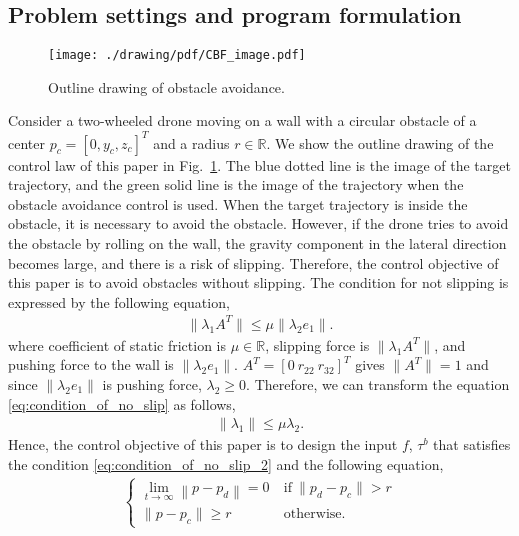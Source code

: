 \subsection{Problem settings and program formulation}
\label{subsec:problem_setting}
\begin{figure}[t]
    \centering
    \texttt{[image: ./drawing/pdf/CBF\_image.pdf]}
    \caption{Outline drawing of obstacle avoidance.}
    \label{fig:outline_drawing_of_obstacle_avoidance}
\end{figure}
Consider a two-wheeled drone moving on a wall with a circular obstacle of a center $ p_c = [0, y_c, z_c]^T $ and a radius $ r \in \mathbb{R} $.
We show the outline drawing of the control law of this paper in Fig.~\ref{fig:outline_drawing_of_obstacle_avoidance}.
The blue dotted line is the image of the target trajectory, and the green solid line is the image of the trajectory when the obstacle avoidance control is used.
When the target trajectory is inside the obstacle, it is necessary to avoid the obstacle.
However, if the drone tries to avoid the obstacle by rolling on the wall, the gravity component in the lateral direction becomes large, and there is a risk of slipping.
Therefore, the control objective of this paper is to avoid obstacles without slipping.
The condition for not slipping is expressed by the following equation,
\begin{align}
    \label{eq:condition_of_no_slip}
    \| \lambda_1 A^T \| \leq \mu \| \lambda_2 e_1 \|.
\end{align}
where coefficient of static friction is $ \mu \in \mathbb{R} $, slipping force is $ \| \lambda_1 A^T \| $, and pushing force to the wall is $ \| \lambda_2 e_1 \|$.
$ A^T = [0 ~ r_{22} ~ r_{32}]^T $ gives $ \| A^T \| = 1 $ and since $ \| \lambda_2 e_1 \| $ is pushing force, $ \lambda_2 \geq 0 $.
Therefore, we can transform the equation \eqref{eq:condition_of_no_slip} as follows,
\begin{align}
    \label{eq:condition_of_no_slip_2}
    \| \lambda_1 \| \leq  \mu \lambda_2.
\end{align}
Hence, the control objective of this paper is to design the input $ f $, $ \tau^b $ that satisfies the condition \eqref{eq:condition_of_no_slip_2} and the following equation,
\begin{align*}
    \begin{cases}
            \displaystyle \lim_{t \rightarrow \infty} 
            \left \| p - p_d \right \| = 0
        &~ {\mathrm{if} } ~ \| p_d - p_c \| > r  \\
        \| p - p_c \| \geq r &~ {\mathrm{otherwise} }.
    \end{cases}
\end{align*}

